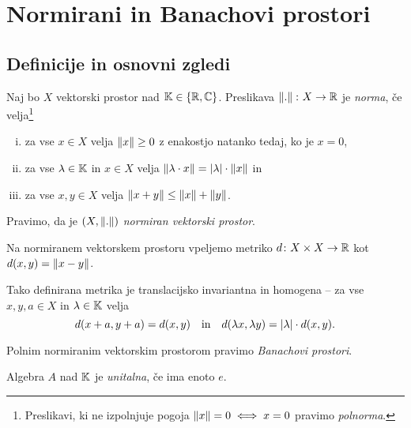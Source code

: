 \section{Normirani in Banachovi prostori}

\subsection{Definicije in osnovni zgledi}


\begin{definicija}
Naj bo $X$ vektorski prostor nad $\mathbb{K} \in \left\{\mathbb{R}, \mathbb{C}\right\}$. Preslikava
$\left\lVert .\right\rVert \colon X \to \mathbb{R}$ je \emph{norma}, če
velja\footnote{Preslikavi, ki ne izpolnjuje pogoja
$\left\lVert x\right\rVert = 0 \iff x = 0$ pravimo \emph{polnorma}.}

\begin{enumerate}[i)]
\item za vse $x \in X$ velja $\left\lVert x\right\rVert \geq 0$ z enakostjo natanko
tedaj, ko je $x=0$,
\item za vse $\lambda \in \mathbb{K}$ in $x \in X$ velja
$\left\lVert \lambda \cdot x\right\rVert = \left\lvert \lambda\right\rvert \cdot \left\lVert x\right\rVert$ in
\item za vse $x,y \in X$ velja $\left\lVert x+y\right\rVert \leq \left\lVert x\right\rVert + \left\lVert y\right\rVert$.
\end{enumerate}

Pravimo, da je $(X, \left\lVert .\right\rVert)$
\emph{normiran vektorski prostor}.
\end{definicija}

\begin{definicija}
Na normiranem vektorskem prostoru vpeljemo metriko
$d \colon X \times X \to \mathbb{R}$ kot $d(x,y) = \left\lVert x-y\right\rVert$.
\end{definicija}

\begin{opomba}
Tako definirana metrika je translacijsko invariantna in homogena --
za vse $x,y,a \in X$ in $\lambda \in \mathbb{K}$ velja
\[
d(x+a, y+a) = d(x, y)
\quad \text{in} \quad
d(\lambda x, \lambda y) = \left\lvert \lambda\right\rvert \cdot d(x,y).
\]
\end{opomba}

\begin{definicija}
Polnim normiranim vektorskim prostorom pravimo
\emph{Banachovi prostori}.
\end{definicija}

\begin{definicija}
Algebra $A$ nad $\mathbb{K}$ je \emph{unitalna},
če ima enoto $e$.
\end{definicija}


